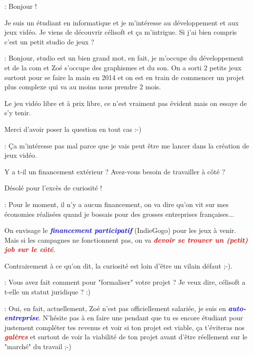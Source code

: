 \documentclass[a4paper,12pt, draft]{report}
\newcommand{\badPoint}[1]{\textcolor{red}{\textbf{\textit{#1}}}}
\newcommand{\importantPoint}[1]{\textcolor{blue}{\textbf{\textit{#1}}}}
\begin{document}
\begin{description}
\item [Question]: Bonjour !
\item Je suis un étudiant en informatique et je m'intéresse au développement et aux jeux vidéo. Je viens de découvrir célisoft et ça m'intrigue. Si j'ai bien compris c'est un petit studio de jeux ?
\item 
\item [Réponse]: Bonjour, studio est un bien grand mot, en fait, je m'occupe du développement et de la com et Zoé s'occupe des graphismes et du son. On a sorti 2 petits jeux surtout pour se faire la main en 2014 et on est en train de commencer un projet plus complexe qui va au moins nous prendre 2 mois.
\item Le jeu vidéo libre et à prix libre, ce n'est vraiment pas évident mais on essaye de s'y tenir.
\item Merci d'avoir poser la question en tout cas :-)
\item 
\item 
\item [Question]: Ça m'intéresse pas mal parce que je vais peut être me lancer dans la création de jeux vidéo.
\item Y a t-il un financement extérieur ? Avez-vous besoin de travailler à côté ?
\item Désolé pour l'excès de curiosité !
\item 
\item [Réponse]: Pour le moment, il n'y a aucun financement, on va dire qu'on vit sur mes économies réalisées quand je bossais pour des grosses entreprises françaises...
\item On envisage le \importantPoint{financement participatif} (IndieGogo) pour les jeux à venir. Mais si les campagnes ne fonctionnent pas, on va \badPoint{devoir se trouver un (petit) job sur le côté}.
\item 
\item Contrairement à ce qu'on dit, la curiosité est loin d'être un vilain défaut ;-).
\item 
\item [Question]: Vous avez fait comment pour "formaliser" votre projet ? Je veux dire, célisoft a t-elle un statut juridique ? :)
\item 
\item [Réponse]: Oui, en fait, actuellement, Zoé n'est pas officiellement salariée, je suis en \importantPoint{auto-entreprise}. N’hésite pas à en faire une pendant que tu es encore étudiant pour justement compléter tes revenus et voir si ton projet est viable, ça t'éviteras nos \badPoint{galères} et surtout de voir la viabilité de ton projet avant d'être réellement sur le "marché" du travail ;-)

\end{description}
\end{document}
